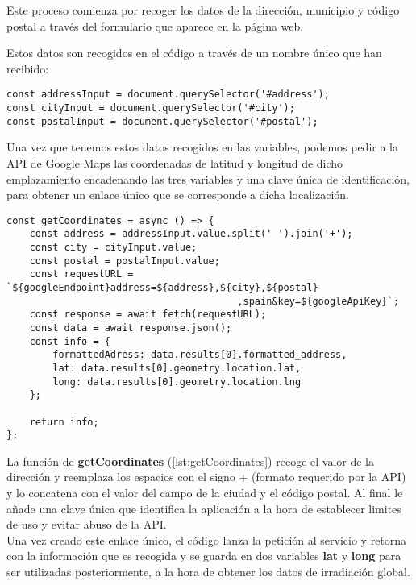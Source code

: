 Este proceso comienza por recoger los datos de la dirección, municipio y código postal a través del formulario que aparece en la página web.

Estos datos son recogidos en el código a través de un nombre único que han recibido:\\
\begin{lstlisting}[style=ES6, caption={Variables correspondientes a los tres campos}]
const addressInput = document.querySelector('#address');
const cityInput = document.querySelector('#city');
const postalInput = document.querySelector('#postal');
\end{lstlisting}

Una vez que tenemos estos datos recogidos en las variables, podemos pedir a la API de Google Maps las coordenadas de latitud y longitud de dicho emplazamiento encadenando las tres variables y una clave única de identificación,  para obtener un enlace único que se corresponde a dicha localización.\\

\begin{lstlisting}[style=ES6, label={lst:getCoordinates}, caption={Función encargada de solicitar los datos a la API}]
const getCoordinates = async () => {
	const address = addressInput.value.split(' ').join('+');
	const city = cityInput.value;
	const postal = postalInput.value;
	const requestURL = `${googleEndpoint}address=${address},${city},${postal}
										,spain&key=${googleApiKey}`;
	const response = await fetch(requestURL);
	const data = await response.json();
	const info = {
		formattedAdress: data.results[0].formatted_address,
		lat: data.results[0].geometry.location.lat,
		long: data.results[0].geometry.location.lng
	};

	return info;
};
\end{lstlisting}

La función de \textbf{getCoordinates} (\ref{lst:getCoordinates}) recoge el valor de la dirección y reemplaza los espacios con el signo + (formato requerido por la API) y lo concatena con el valor del campo de la ciudad y el código postal. Al final le añade una clave única que identifica la aplicación a la hora de establecer limites de uso y evitar abuso de la API.\\

Una vez creado este enlace único, el código lanza la petición al servicio y retorna con la información que es recogida y se guarda en dos variables \textbf{lat} y \textbf{long} para ser utilizadas posteriormente, a la hora de obtener los datos de irradiación global.

